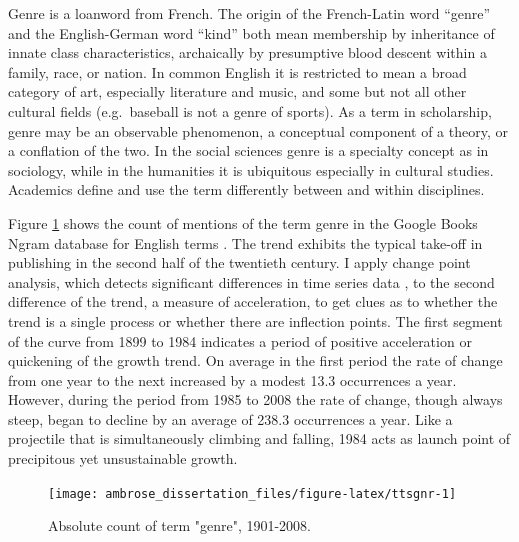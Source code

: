 \documentclass[]{book}
\theoremstyle{definition}
\theoremstyle{definition}
\theoremstyle{definition}
\theoremstyle{remark}
\begin{document}
Genre is a loanword from French. The origin of the French-Latin word
``genre'' and the English-German word ``kind'' both mean membership by
inheritance of innate class characteristics, archaically by presumptive
blood descent within a family, race, or nation. In common English it is
restricted to mean a broad category of art, especially literature and
music, and some but not all other cultural fields (e.g.~baseball is not
a genre of sports). As a term in scholarship, genre may be an observable
phenomenon, a conceptual component of a theory, or a conflation of the
two. In the social sciences genre is a specialty concept as in
sociology, while in the humanities it is ubiquitous especially in
cultural studies. Academics define and use the term differently between
and within disciplines.

Figure \ref{fig:ttsgnr} shows the count of mentions of the term genre in
the Google Books Ngram database for English terms
\citep{Michel2011Quantitative}. The trend exhibits the typical take-off
in publishing in the second half of the twentieth century. I apply
change point analysis, which detects significant differences in time
series data \citep{Matteson2013Nonparametric, James2019ecp}, to the
second difference of the trend, a measure of acceleration, to get clues
as to whether the trend is a single process or whether there are
inflection points. The first segment of the curve from 1899 to 1984
indicates a period of positive acceleration or quickening of the growth
trend. On average in the first period the rate of change from one year
to the next increased by a modest 13.3 occurrences a year. However,
during the period from 1985 to 2008 the rate of change, though always
steep, began to decline by an average of 238.3 occurrences a year. Like
a projectile that is simultaneously climbing and falling, 1984 acts as
launch point of precipitous yet unsustainable growth.

\begin{figure}

{\centering \texttt{[image: ambrose\_dissertation\_files/figure-latex/ttsgnr-1]} 

}

\caption{Absolute count of term "genre", 1901-2008.}\label{fig:ttsgnr}
\end{figure}
\end{document}
